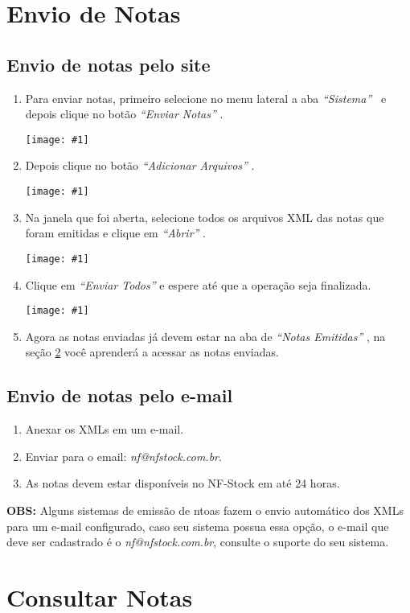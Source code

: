 \documentclass{article}
\newcommand{\itasp}[1]{
  \textit{``#1''}
}
\newcommand{\imagem}[2]{
  \begin{center}
    \texttt{[image: \#1]}
  \end{center}
}
\begin{document}
  
  \section{Envio de Notas}
  \label{sec:envio-notas-nfstock}
  
  \subsection{Envio de notas pelo site}
  \begin{enumerate}
    \item Para enviar notas, primeiro selecione no menu lateral a aba \itasp{Sistema} \ e depois clique no botão \itasp{Enviar Notas}. \imagem{menu-sistema.PNG}{.4}
    \item Depois clique no botão \itasp{Adicionar Arquivos}. \imagem{botao-enviar.PNG}{.4}
    \pagebreak
    \item Na janela que foi aberta, selecione todos os arquivos XML das notas que foram emitidas e clique em \itasp{Abrir}. \imagem{selecionar-arquivos.PNG}{.6}
    \item Clique em \itasp{Enviar Todos} e espere até que a operação seja finalizada. \imagem{enviar-todos.PNG}{.6}
    \item Agora as notas enviadas já devem estar na aba de \itasp{Notas Emitidas}, na seção \ref{sec:notasnfstock} você aprenderá a acessar as notas enviadas.
  \end{enumerate}
  
  \subsection{Envio de notas pelo e-mail}
  \begin{enumerate}
    \item Anexar os XMLs em um e-mail.
    \item Enviar para o email: \textit{nf@nfstock.com.br}.
    \item As notas devem estar disponíveis no NF-Stock em até 24 horas.
  \end{enumerate}
  \textbf{OBS:} Alguns sistemas de emissão de ntoas fazem o envio automático dos XMLs para um e-mail configurado, caso seu sistema possua essa opção, o e-mail que deve ser cadastrado é o \textit{nf@nfstock.com.br}, consulte o suporte do seu sistema.
  \pagebreak
  \section{Consultar Notas}
  \label{sec:notasnfstock}
  
\end{document}
